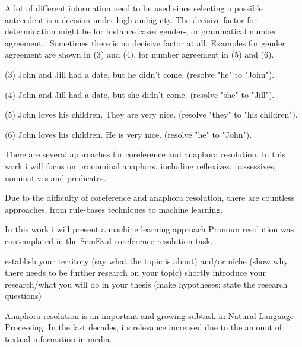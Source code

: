 A lot of different information need to be used since selecting a possible antecedent is a decision under high ambiguity. The decisive factor for determination might be for instance cases gender-, or grammatical number agreement . Sometimes there is no decisive factor at all. Examples for gender agreement are shown in (3) and (4), for number agreement in (5) and (6).

(3) John and Jill had a date, but he didn't come. (resolve "he" to "John").

(4) John and Jill had a date, but she didn't come. (resolve "she" to "Jill").

(5) John loves his children. They are very nice. (resolve "they" to "his children").

(6) John loves his children. He is very nice. (resolve "he" to "John").

There are several approaches for coreference and anaphora resolution. 
In this work i will focus on pronominal anaphors, including reflexives, possessives, nominatives and predicates. 

Due to the difficulty of coreference and anaphora resolution, there are countless approaches, from rule-bases techniques to machine learning. 

In this work i will present a machine learning approach 
Pronoun resolution was contemplated in the SemEval coreference resolution task. 




establish your territory (say what the topic is about) and/or niche (show why there needs to be further research on your topic)
shortly introduce your research/what you will do in your thesis (make hypotheses; state the research questions)


Anaphora resolution is an important and growing subtask in Natural Language Processing. In the last decades, its relevance increased due to the amount of textual information in media. 